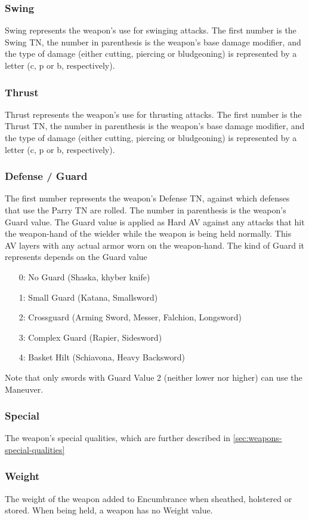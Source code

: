 \documentclass[oneside,11pt,english]{book}
\begin{document}
\subsubsection{Swing}
Swing represents the weapon’s use for swinging attacks. The first number is the Swing TN, the number in parenthesis 
is the weapon’s base damage modifier, and the type of damage (either cutting, piercing or bludgeoning) is represented 
by a letter (c, p or b, respectively). 
\subsubsection{Thrust}
Thrust represents the weapon’s use for thrusting attacks. The first number is the Thrust TN, the number in parenthesis 
is the weapon’s base damage modifier, and the type of damage (either cutting, piercing or bludgeoning) is represented 
by a letter (c, p or b, respectively). 
\subsubsection{Defense / Guard}
The first number represents the weapon’s Defense TN, against which defenses that use the Parry TN are rolled. The 
number in parenthesis is the weapon’s Guard value. The Guard value is applied as Hard AV against any attacks that hit
the weapon-hand of the wielder while the weapon is being held normally. This AV layers with any actual armor worn 
on the weapon-hand. The kind of Guard it represents depends on the Guard value
\begin{itemize}
	\item [0:] No Guard (Shaska, khyber knife)
	\item [1:] Small Guard (Katana, Smallsword)
	\item [2:] Crossguard (Arming Sword, Messer, Falchion, Longsword)
	\item [3:] Complex Guard (Rapier, Sidesword)
	\item [4:] Basket Hilt (Schiavona, Heavy Backsword)
\end{itemize}
Note that only swords with Guard Value 2 (neither lower nor higher) can use the  Maneuver.
\subsubsection{Special}
The weapon’s special qualities, which are further described in \autoref{sec:weapons-special-qualities}
\subsubsection{Weight}
The weight of the weapon added to Encumbrance when sheathed, holstered or stored. When being held, a weapon has 
no Weight value.
\end{document}
